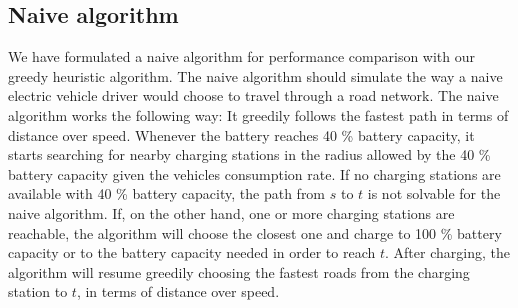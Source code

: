 \subsection{Naive algorithm}
\label{sub:naivealgorithm}
We have formulated a naive algorithm for performance comparison with our greedy heuristic algorithm. The naive algorithm should simulate the way a naive electric vehicle driver would choose to travel through a road network. The naive algorithm works the following way: It greedily follows the fastest path in terms of distance over speed. Whenever the battery reaches 40 \% battery capacity, it starts searching for nearby charging stations in the radius allowed by the 40 \% battery capacity given the vehicles consumption rate. If no charging stations are available with 40 \% battery capacity, the path from $s$ to $t$ is not solvable for the naive algorithm. If, on the other hand, one or more charging stations are reachable, the algorithm will choose the closest one and charge to 100 \% battery capacity or to the battery capacity needed in order to reach $t$. After charging, the algorithm will resume greedily choosing the fastest roads from the charging station to $t$, in terms of distance over speed.